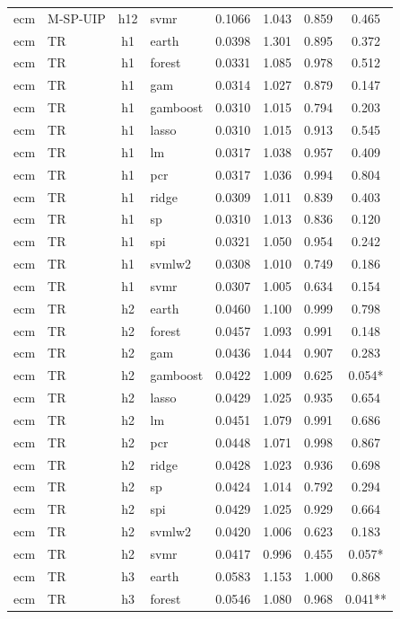 \begin{ThreePartTable}
\begin{longtable}[t]{llclcccc}
ecm & M-SP-UIP & h12 & svmr & 0.1066 & 1.043 & 0.859 & 0.465\\
\addlinespace
ecm & TR & h1 & earth & 0.0398 & 1.301 & 0.895 & 0.372\\
ecm & TR & h1 & forest & 0.0331 & 1.085 & 0.978 & 0.512\\
ecm & TR & h1 & gam & 0.0314 & 1.027 & 0.879 & 0.147\\
ecm & TR & h1 & gamboost & 0.0310 & 1.015 & 0.794 & 0.203\\
ecm & TR & h1 & lasso & 0.0310 & 1.015 & 0.913 & 0.545\\
ecm & TR & h1 & lm & 0.0317 & 1.038 & 0.957 & 0.409\\
ecm & TR & h1 & pcr & 0.0317 & 1.036 & 0.994 & 0.804\\
ecm & TR & h1 & ridge & 0.0309 & 1.011 & 0.839 & 0.403\\
ecm & TR & h1 & sp & 0.0310 & 1.013 & 0.836 & 0.120\\
ecm & TR & h1 & spi & 0.0321 & 1.050 & 0.954 & 0.242\\
ecm & TR & h1 & svmlw2 & 0.0308 & 1.010 & 0.749 & 0.186\\
ecm & TR & h1 & svmr & 0.0307 & 1.005 & 0.634 & 0.154\\
\addlinespace
ecm & TR & h2 & earth & 0.0460 & 1.100 & 0.999 & 0.798\\
ecm & TR & h2 & forest & 0.0457 & 1.093 & 0.991 & 0.148\\
ecm & TR & h2 & gam & 0.0436 & 1.044 & 0.907 & 0.283\\
ecm & TR & h2 & gamboost & 0.0422 & 1.009 & 0.625 & 0.054*\\
ecm & TR & h2 & lasso & 0.0429 & 1.025 & 0.935 & 0.654\\
ecm & TR & h2 & lm & 0.0451 & 1.079 & 0.991 & 0.686\\
ecm & TR & h2 & pcr & 0.0448 & 1.071 & 0.998 & 0.867\\
ecm & TR & h2 & ridge & 0.0428 & 1.023 & 0.936 & 0.698\\
ecm & TR & h2 & sp & 0.0424 & 1.014 & 0.792 & 0.294\\
ecm & TR & h2 & spi & 0.0429 & 1.025 & 0.929 & 0.664\\
ecm & TR & h2 & svmlw2 & 0.0420 & 1.006 & 0.623 & 0.183\\
ecm & TR & h2 & svmr & 0.0417 & 0.996 & 0.455 & 0.057*\\
\addlinespace
ecm & TR & h3 & earth & 0.0583 & 1.153 & 1.000 & 0.868\\
ecm & TR & h3 & forest & 0.0546 & 1.080 & 0.968 & 0.041**\\

\end{longtable}
\end{ThreePartTable}
